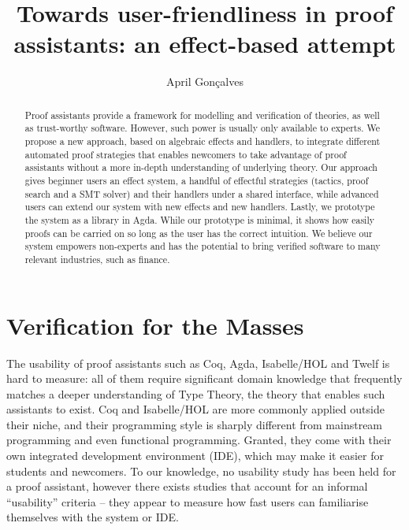 \documentclass[acmsmall]{acmart}
\begin{document}
\title[Towards user-friendliness in theorem provers]{Towards user-friendliness
  in proof assistants: an effect-based attempt}

\author{April Gonçalves}

\renewcommand{\shortauthors}{April Gonçalves}

\begin{abstract}
Proof assistants provide a framework for modelling and verification of
theories, as well as trust-worthy software. However, such power is usually only
available to experts. We propose a new approach, based on algebraic effects and
handlers, to integrate different automated proof strategies that enables
newcomers to take advantage of proof assistants without a more in-depth
understanding of underlying theory. Our approach gives beginner users an effect
system, a handful of effectful strategies (tactics, proof search and a SMT
solver) and their handlers under a shared interface, while advanced users can
extend our system with new effects and new handlers. Lastly, we prototype the
system as a library in Agda. While our prototype is minimal, it shows how easily
proofs can be carried on so long as the user has the correct intuition. We
believe our system empowers non-experts and has the potential to bring verified
software to many relevant industries, such as finance.
\end{abstract}


\maketitle

\section{Verification for the Masses}

The usability of proof assistants such as Coq, Agda, Isabelle/HOL and Twelf is
hard to measure: all of them require significant domain knowledge that
frequently matches a deeper understanding of Type Theory, the theory that
enables such assistants to exist. Coq and Isabelle/HOL are more commonly applied
outside their niche, and their programming style is sharply different from
mainstream programming and even functional programming. Granted, they come with
their own integrated development environment (IDE), which may make it easier for
students and newcomers. To our knowledge, no usability study has been
held for a proof assistant, however there exists studies that account for
an informal ``usability'' criteria -- they appear to measure how fast users can
familiarise themselves with the system or IDE.
\end{document}
